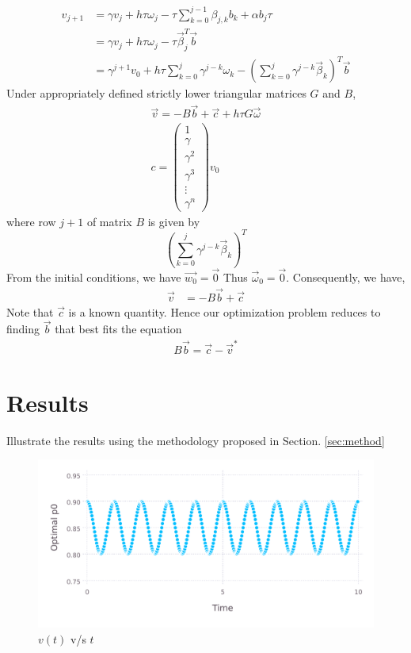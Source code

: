 \documentclass{ifacconf}
\begin{document}
\begin{align} \label{eq:p0evolution}
v_{j+1} &= \gamma v_j + h\tau\omega_j - \tau\sum_{k=0}^{j-1}\beta_{j,k}b_k
	   + \alpha b_j\tau \\
	   &= \gamma v_j + h\tau\omega_j - \tau \vec{\beta}_j^T \vec{b}\\
	   &= \gamma^{j+1}v_0 
	   + h\tau\sum_{k=0}^{j} \gamma^{j-k}\omega_k
	   - \left(\sum_{k=0}^{j} \gamma^{j-k} \vec{\beta}_k\right)^T \vec{b}
\end{align}
Under appropriately defined strictly lower triangular matrices $G$ and $B$,
\begin{align}
	\vec{v} = - B\vec{b}+\vec{c} + h\tau G\vec{\omega}  \\
	c=\begin{pmatrix} 1 \\ \gamma \\  \gamma^2 \\ \gamma^3 \\ \vdots \\ \gamma^{n} \end{pmatrix}v_0
\end{align}
where row $j+1$ of matrix $B$ is given by
\[
\left(\sum_{k=0}^{j} \gamma^{j-k} \vec{\beta}_k\right)^T
\]
From the initial conditions, we have $\vec{w_0} = \vec{0}$ Thus $\vec{\omega}_0 =
\vec{0}$. Consequently, we have,
\begin{align}
	\vec{v} &= -B\vec{b} + \vec{c}
\end{align}
Note that $\vec{c}$ is a known quantity.
Hence our optimization problem reduces to finding $\vec{b}$ that best fits the equation
\begin{align}
	B\vec{b} = \vec{c}-\vec{v}^*
\end{align}

\section{Results}
Illustrate the results using the methodology proposed in Section. \ref{sec:method}

\begin{figure}
	\label{fig:estv}
	\includegraphics[width=\linewidth]{estv.pdf}
	\caption{$v(t)$ v/s $t$}
\end{figure}
\end{document}
